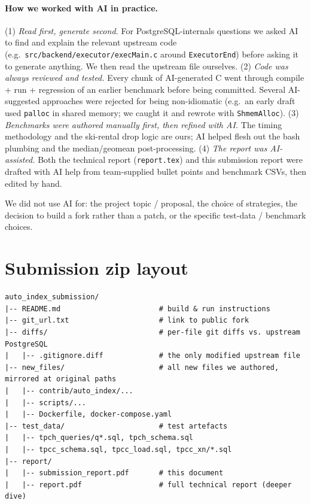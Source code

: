 \documentclass[10pt,a4paper]{article}
\newcommand{\code}[1]{\texttt{\small #1}}
\begin{document}
\paragraph{How we worked with AI in practice.}
(1) \emph{Read first, generate second.} For PostgreSQL-internals
questions we asked AI to find and explain the relevant upstream code
(e.g.\ \code{src/backend/executor/execMain.c} around
\code{ExecutorEnd}) before asking it to generate anything. We then
read the upstream file ourselves.
(2) \emph{Code was always reviewed and tested.} Every chunk of
AI-generated C went through compile + run + regression of an earlier
benchmark before being committed. Several AI-suggested approaches
were rejected for being non-idiomatic (e.g.\ an early draft used
\code{palloc} in shared memory; we caught it and rewrote with
\code{ShmemAlloc}).
(3) \emph{Benchmarks were authored manually first, then refined with
AI.} The timing methodology and the ski-rental drop logic are ours;
AI helped flesh out the bash plumbing and the median/geomean
post-processing.
(4) \emph{The report was AI-assisted.} Both the technical report
(\code{report.tex}) and this submission report were drafted with AI
help from team-supplied bullet points and benchmark CSVs, then edited
by hand.

We did not use AI for: the project topic / proposal, the choice of
strategies, the decision to build a fork rather than a patch, or the
specific test-data / benchmark choices.

\section{Submission zip layout}

\begin{verbatim}
auto_index_submission/
|-- README.md                       # build & run instructions
|-- git_url.txt                     # link to public fork
|-- diffs/                          # per-file git diffs vs. upstream PostgreSQL
|   |-- .gitignore.diff             # the only modified upstream file
|-- new_files/                      # all new files we authored, mirrored at original paths
|   |-- contrib/auto_index/...
|   |-- scripts/...
|   |-- Dockerfile, docker-compose.yaml
|-- test_data/                      # test artefacts
|   |-- tpch_queries/q*.sql, tpch_schema.sql
|   |-- tpcc_schema.sql, tpcc_load.sql, tpcc_xn/*.sql
|-- report/
|   |-- submission_report.pdf       # this document
|   |-- report.pdf                  # full technical report (deeper dive)
\end{verbatim}
\end{document}

